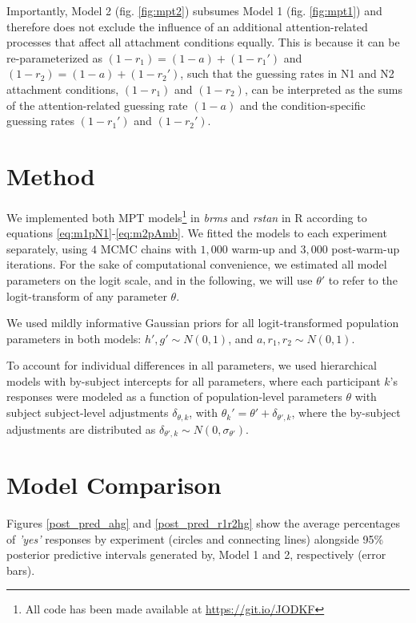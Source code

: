 \documentclass[11pt]{article}\usepackage[]{graphicx}\usepackage[]{color}
\begin{document}
Importantly, Model 2 (fig. \ref{fig:mpt2}) subsumes Model 1 (fig. \ref{fig:mpt1}) and therefore does not exclude the influence of an additional attention-related processes that affect all attachment conditions equally. 
This is because it can be re-parameterized as $(1-r_1) = (1-a) + (1-r_1')$ and $(1-r_2) = (1-a) + (1-r_2')$, such that the guessing rates in N1 and N2 attachment conditions, $(1-r_1)$ and $(1-r_2)$, can be interpreted as the sums of the attention-related guessing rate $(1-a)$ and the condition-specific guessing rates $(1-r_1')$ and $(1-r_2')$.


\section{Method}

We implemented both MPT models\footnote{All code has been made available at \url{https://git.io/JODKF}}
in \textit{brms} and \textit{rstan} \citep{R-brms, rstan} in R \citep{R-base} according to equations \ref{eq:m1pN1}-\ref{eq:m2pAmb}. We fitted the models to each experiment separately, using $4$ MCMC chains with $1,000$ warm-up and $3,000$ post-warm-up iterations.
For the sake of computational convenience, we estimated all model parameters on the logit scale, and in the following, we will use $\theta'$ to refer to the logit-transform of any parameter $\theta$.

We used mildly informative Gaussian priors for all logit-transformed population parameters in both models: $h', g' \sim N(0,1)$, and $a, r_1, r_2 \sim N(0,1)$.

To account for individual differences in all parameters, we used hierarchical models with by-subject intercepts for all parameters, where each participant $k$'s responses were modeled as a function of population-level parameters $\theta$ with subject subject-level adjustments $\delta_{\theta,k}$, with $\theta_k' = \theta' + \delta_{{\theta'},k}$, where the by-subject adjustments are  distributed as $\delta_{{\theta'},k} \sim N(0, \sigma_{\theta'})$.


\section{Model Comparison}

Figures \ref{post_pred_ahg} and \ref{post_pred_r1r2hg} show the average percentages of \textit{'yes'} responses by experiment (circles and connecting lines) alongside 95\% posterior predictive intervals generated by, Model 1 and 2, respectively (error bars).
\end{document}

